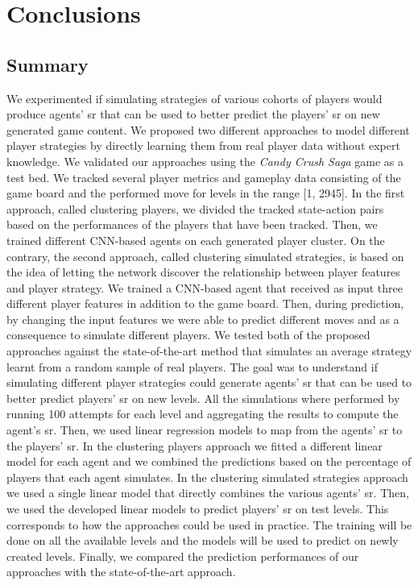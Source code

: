 \chapter{Conclusions}
\label{chap:conclusions}

\section{Summary}
We experimented if simulating strategies of various cohorts of players would produce agents' \acs{sr} that can be used to better predict the players' \acs{sr} on new generated game content. We proposed two different approaches to model different player strategies by directly learning them from real player data without expert knowledge. We validated our approaches using the \textit{Candy Crush Saga} game as a test bed. We tracked several player metrics and gameplay data consisting of the game board and the performed move for levels in the range [1, 2945]. In the first approach, called clustering players, we divided the tracked state-action pairs based on the performances of the players that have been tracked. Then, we trained different \acs{CNN}-based agents on each generated player cluster. On the contrary, the second approach, called clustering simulated strategies, is based on the idea of letting the network discover the relationship between player features and player strategy. We trained a \acs{CNN}-based agent that received as input three different player features in addition to the game board. Then, during prediction, by changing the input features we were able to predict different moves and as a consequence to simulate different players. We tested both of the proposed approaches against the state-of-the-art method that simulates an average strategy learnt from a random sample of real players. The goal was to understand if simulating different player strategies could generate agents' \acs{sr} that can be used to better predict players' \acs{sr} on new levels. All the simulations where performed by running 100 attempts for each level and aggregating the results to compute the agent's \acs{sr}. Then, we used linear regression models to map from the agents' \acs{sr} to the players' \acs{sr}. In the clustering players approach we fitted a different linear model for each agent and we combined the predictions based on the percentage of players that each agent simulates. In the clustering simulated strategies approach we used a single linear model that directly combines the various agents' \acs{sr}. Then, we used the developed linear models to predict players' \acs{sr} on test levels. This corresponds to how the approaches could be used in practice. The training will be done on all the available levels and the models will be used to predict on newly created levels. Finally, we compared the prediction performances of our approaches with the state-of-the-art approach. 
